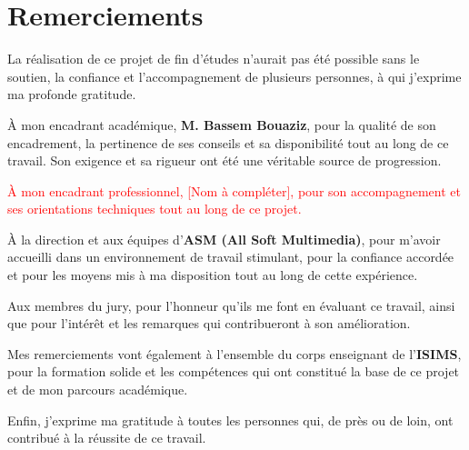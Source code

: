 \thispagestyle{empty}
\chapter*{Remerciements}

\vspace{1cm}
\setlength{\parskip}{10pt}

La réalisation de ce projet de fin d'études n'aurait pas été possible sans le soutien, la confiance
et l'accompagnement de plusieurs personnes, à qui j'exprime ma profonde gratitude.

À mon encadrant académique, \textbf{M. Bassem Bouaziz}, pour la qualité de son encadrement, la
pertinence de ses conseils et sa disponibilité tout au long de ce travail. Son exigence et sa
rigueur ont été une véritable source de progression.

\textcolor{red}{À mon encadrant professionnel, [Nom à compléter], pour son accompagnement et ses
orientations techniques tout au long de ce projet.}

À la direction et aux équipes d'\textbf{ASM (All Soft Multimedia)}, pour m'avoir accueilli dans un
environnement de travail stimulant, pour la confiance accordée et pour les moyens mis à ma
disposition tout au long de cette expérience.

Aux membres du jury, pour l'honneur qu'ils me font en évaluant ce travail, ainsi que pour l'intérêt
et les remarques qui contribueront à son amélioration.

Mes remerciements vont également à l'ensemble du corps enseignant de l'\textbf{ISIMS}, pour la
formation solide et les compétences qui ont constitué la base de ce projet et de mon parcours
académique.

Enfin, j'exprime ma gratitude à toutes les personnes qui, de près ou de loin, ont contribué à la
réussite de ce travail.

\clearpage
